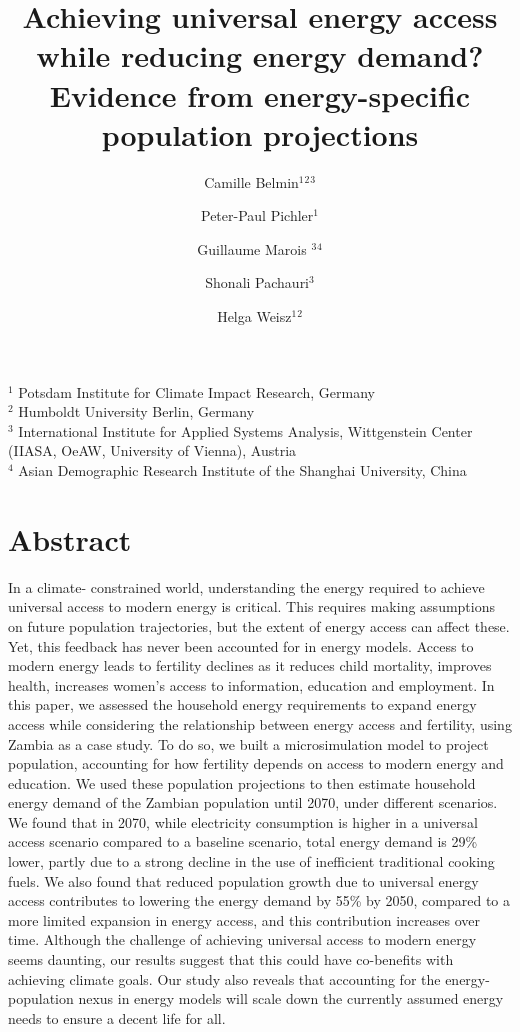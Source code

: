 \documentclass[
]{article}
\title{Achieving universal energy access while reducing energy demand? Evidence from energy-specific population projections}
\author{Camille Belmin\(^1\)\(^2\)\(^3\) \and Peter-Paul Pichler\(^1\) \and Guillaume Marois \(^3\)\(^4\) \and Shonali Pachauri\(^3\) \and Helga Weisz\(^1\)\(^2\)}
\date{}
\begin{document}
\maketitle

\(^1\) Potsdam Institute for Climate Impact Research, Germany\\
\(^2\) Humboldt University Berlin, Germany\\
\(^3\) International Institute for Applied Systems Analysis, Wittgenstein Center (IIASA, OeAW, University of Vienna), Austria\\
\(^4\) Asian Demographic Research Institute of the Shanghai University, China

\hypertarget{abstract}{%
\section*{Abstract}\label{abstract}}

In a climate- constrained world, understanding the energy required to achieve universal access to modern energy is critical. This requires making assumptions on future population trajectories, but the extent of energy access can affect these. Yet, this feedback has never been accounted for in energy models. Access to modern energy leads to fertility declines as it reduces child mortality, improves health, increases women's access to information, education and employment. In this paper, we assessed the household energy requirements to expand energy access while considering the relationship between energy access and fertility, using Zambia as a case study. To do so, we built a microsimulation model to project population, accounting for how fertility depends on access to modern energy and education. We used these population projections to then estimate household energy demand of the Zambian population until 2070, under different scenarios. We found that in 2070, while electricity consumption is higher in a universal access scenario compared to a baseline scenario, total energy demand is 29\% lower, partly due to a strong decline in the use of inefficient traditional cooking fuels. We also found that reduced population growth due to universal energy access contributes to lowering the energy demand by 55\% by 2050, compared to a more limited expansion in energy access, and this contribution increases over time. Although the challenge of achieving universal access to modern energy seems daunting, our results suggest that this could have co-benefits with achieving climate goals. Our study also reveals that accounting for the energy-population nexus in energy models will scale down the currently assumed energy needs to ensure a decent life for all.
\end{document}
